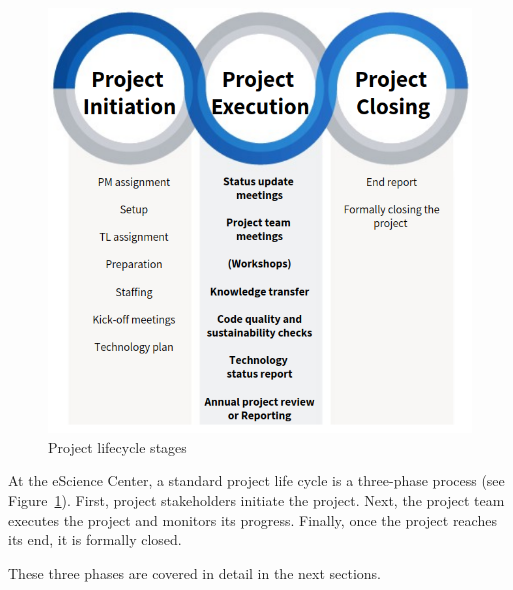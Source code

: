 \begin{figure}[!h]
    \centering
    \includegraphics[scale=0.5]{img/lifecycle-stages.png}
    \caption{Project lifecycle stages}
    \label{fig:project-lifecycle}
\end{figure}

At the eScience Center, a standard project life cycle is a three-phase process (see Figure~\ref{fig:project-lifecycle}). First, project stakeholders initiate the
project. Next, the project team executes the project and monitors its progress. Finally, once the project reaches its
end, it is formally closed.

These three phases are covered in detail in the next sections.
